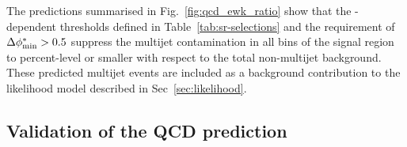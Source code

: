 
The predictions summarised in Fig.~\ref{fig:qcd_ewk_ratio} show that 
the \HT-dependent \alphat thresholds defined in Table~\ref{tab:sr-selections} 
and the requirement of $\mbox{$\Delta\phi^{*}_{\rm min}$} > 0.5$ suppress the multijet
contamination in all bins of the signal region to percent-level or smaller with
respect to the total non-multijet background. These predicted multijet events are 
included as a background contribution to the likelihood model
described in Sec~\ref{sec:likelihood}.


\subsection{Validation of the QCD prediction}
\label{sec:qcdValidation}

